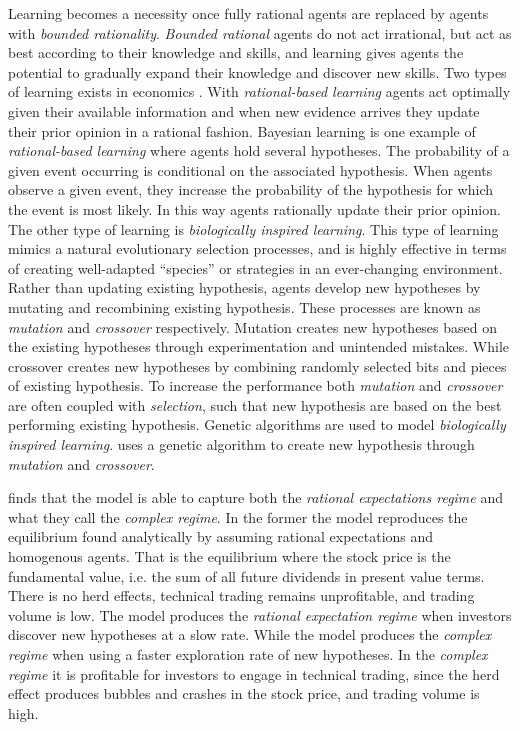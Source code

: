 \documentclass[preprint, 12pt]{elsarticle}
\begin{document}
Learning becomes a necessity once fully rational agents are replaced by agents with \emph{bounded rationality}. \emph{Bounded rational} agents do not act irrational, but act as best according to their knowledge and skills, and learning gives agents the potential to gradually expand their knowledge and discover new skills. Two types of learning exists in economics \citep[chapter~4]{Ehrentreich_2007}. With \emph{rational-based learning} agents act optimally given their available information and when new evidence arrives they update their prior opinion in a rational fashion. Bayesian learning is one example of \emph{rational-based learning} where agents hold several hypotheses. The probability of a given event occurring is conditional on the associated hypothesis. When agents observe a given event, they increase the probability of the hypothesis for which the event is most likely. In this way agents rationally update their prior opinion. The other type of learning is \emph{biologically inspired learning}. This type of learning mimics a natural evolutionary selection processes, and is highly effective in terms of creating well-adapted ``species'' or strategies in an ever-changing environment. Rather than updating existing hypothesis, agents develop new hypotheses by mutating and recombining existing hypothesis. These processes are known as \emph{mutation} and \emph{crossover} respectively. Mutation creates new hypotheses based on the existing hypotheses through experimentation and unintended mistakes. While crossover creates new hypotheses by combining randomly selected bits and pieces of existing hypothesis. To increase the performance both \emph{mutation} and \emph{crossover} are often coupled with \emph{selection}, such that new hypothesis are based on the best performing existing hypothesis. Genetic algorithms are used to model \emph{biologically inspired learning}. \citet[chapter~3]{Arthur_2014} uses a genetic algorithm to create new hypothesis through \emph{mutation} and \emph{crossover}.

\citet[chapter~3]{Arthur_2014} finds that the model is able to capture both the \emph{rational expectations regime} and what they call the \emph{complex regime}. In the former the model reproduces the equilibrium found analytically by assuming rational expectations and homogenous agents. That is the equilibrium where the stock price is the fundamental value, i.e. the sum of all future dividends in present value terms. There is no herd effects, technical trading remains unprofitable, and trading volume is low. The model produces the \emph{rational expectation regime} when investors discover new hypotheses at a slow rate. While the model produces the \emph{complex regime} when using a faster exploration rate of new hypotheses. In the \emph{complex regime} it is profitable for investors to engage in technical trading, since the herd effect produces bubbles and crashes in the stock price, and trading volume is high. 
\end{document}
